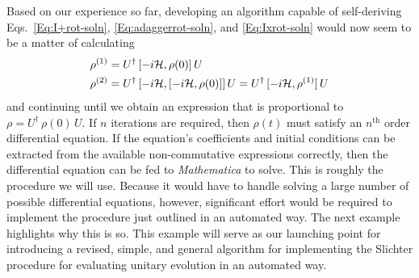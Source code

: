 Based on our experience so far, developing an algorithm capable of self-deriving Eqs.~\ref{Eq:I+rot-soln}, \ref{Eq:adaggerrot-soln}, and \ref{Eq:Ixrot-soln} would now seem to be a matter of calculating
\begin{align}
\rho^{(1)} & = U^{\dagger} \, [-i {\cal H}, \rho(0)] \, U \\
\rho^{(2)} & = U^{\dagger} \, [-i {\cal H}, [-i {\cal H}, \rho(0)]] \, U
	= U^{\dagger} \, [-i {\cal H}, \rho^{(1)}] \, U
\end{align}
and continuing until we obtain an expression that is proportional to $\rho = U^{\dagger} \, \rho(0) \, U$. If $n$ iterations are required, then $\rho(t)$ must satisfy an $n^\text{th}$ order differential equation.  If the equation's coefficients and initial conditions can be extracted from the  available non-commutative expressions correctly, then the differential equation can be fed to \emph{Mathematica} to solve.  This is roughly the procedure we will use.  Because it would have to handle solving a large number of possible differential equations, however, significant effort would be required to implement the procedure just outlined in an automated way.  The next example highlights why this is so.  This example will serve as our launching point for introducing a revised, simple, and general algorithm for implementing the Slichter procedure for evaluating unitary evolution in an automated way. 

